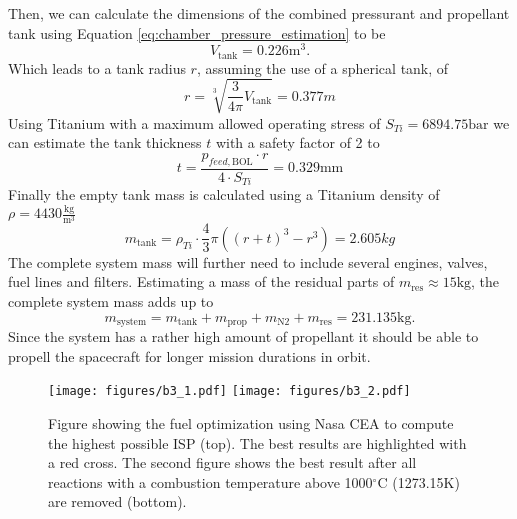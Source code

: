 \documentclass[12pt]{article}
\begin{document}
Then, we can calculate the dimensions of the combined pressurant and propellant tank using Equation \ref{eq:chamber_pressure_estimation} to be
\begin{equation*}
	V_{\text{tank}} = 0.226\text{m}^3.
\end{equation*}
Which leads to a tank radius $r$, assuming the use of a spherical tank, of
\begin{equation*}
	r = \sqrt[3]{\frac{3}{4\pi} V_{\text{tank}}} = 0.377m
\end{equation*}
Using Titanium with a maximum allowed operating stress of $S_{Ti}=6894.75\text{bar}$ we can estimate the tank thickness $t$ with a safety factor of 2 to
\begin{equation*}
	t = \frac{p_{feed,\text{BOL}}\cdot r}{4 \cdot S_{Ti}} = 0.329\text{mm}
\end{equation*}
Finally the empty tank mass is calculated using a Titanium density of $\rho=4430\frac{\text{kg}}{\text{m}^3}$
\begin{equation*}
	m_{\text{tank}} = \rho_{Ti} \cdot \frac{4}{3} \pi ((r+t)^3 - r^3) = 2.605kg
\end{equation*}
The complete system mass will further need to include several engines, valves, fuel lines and filters. Estimating a mass of the residual parts of $m_{\text{res}} \approx 15\text{kg}$, the complete system mass adds up to 
\begin{equation*}
m_{\text{system}} = m_{\text{tank}} + m_{\text{prop}} + m_{\text{N2}} + m_{\text{res}} = 231.135\text{kg}.
\end{equation*}
Since the system has a rather high amount of propellant it should be able to propell the spacecraft for longer mission durations in orbit.

\newpage
\begin{figure}[!h]
	\centering
	\texttt{[image: figures/b3\_1.pdf]}
	\texttt{[image: figures/b3\_2.pdf]}
	\caption{Figure showing the fuel optimization using Nasa CEA to compute the highest possible ISP (top). The best results are highlighted with a red cross. The second figure shows the best result after all reactions with a combustion temperature above 1000$^\circ$C (1273.15K) are removed (bottom).}
	\label{fig:fuel_optimization_all_results}
\end{figure}
\end{document}
